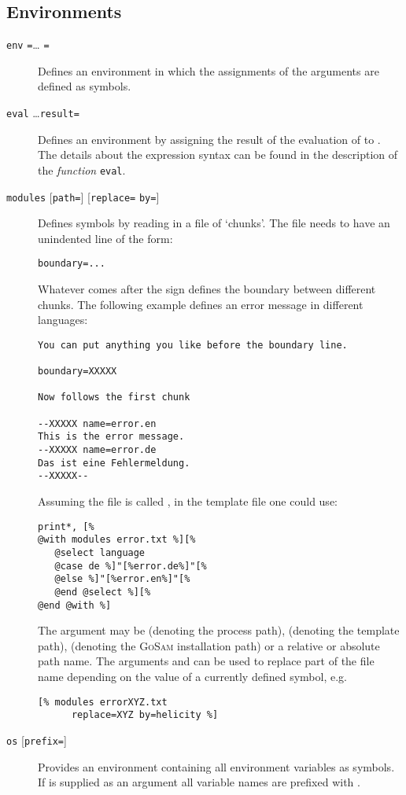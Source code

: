 \documentclass[11pt,a4paper]{refrep}
\newcommand{\golem}{\textsc{GoSam}\xspace}
\begin{document}
\subsection{Environments}
\begin{description}
\item[\texttt{env}
   \texttt{=}\dots
   \texttt{=}]
   Defines an environment in which the assignments of the arguments
   are defined as symbols.
\item[\texttt{eval}  \ldots \texttt{result=}]
   Defines an environment by assigning the result of the evaluation of
    to . The details about the expression
   syntax can be found in the description of the \emph{function} \texttt{eval}.
\item[\texttt{modules} 
   {[\texttt{path=}]}
   {[\texttt{replace=} \texttt{by=}]}]
   Defines symbols by reading in a file of `chunks'. The file needs to
   have an unindented line of the form:
\begin{verbatim}
boundary=...
\end{verbatim}
   Whatever comes after the \lit{=} sign defines the boundary between
   different chunks. The following example defines an error message
   in different languages:
\begin{verbatim}
You can put anything you like before the boundary line.

boundary=XXXXX

Now follows the first chunk

--XXXXX name=error.en
This is the error message.
--XXXXX name=error.de
Das ist eine Fehlermeldung.
--XXXXX--
\end{verbatim}
   Assuming the file is called ,
   in the template file one could use:
\begin{lstlisting}
print*, [%
@with modules error.txt %][%
   @select language
   @case de %]"[%error.de%]"[%
   @else %]"[%error.en%]"[%
   @end @select %][%
@end @with %]
\end{lstlisting}
   The argument  may be  (denoting the process path),
    (denoting the template path),
    (denoting the \golem{} installation path) or
   a relative or absolute path name. The arguments  and
    can be used to replace part of the file name
   depending on the value of a currently defined symbol, e.g.
\begin{lstlisting}
[% modules errorXYZ.txt
      replace=XYZ by=helicity %]
\end{lstlisting}
\item[\texttt{os} {[\texttt{prefix=}]}]
   Provides an environment containing all environment variables
   as symbols. If  is supplied as an argument all
   variable names are prefixed with .
\end{description}
\end{document}
